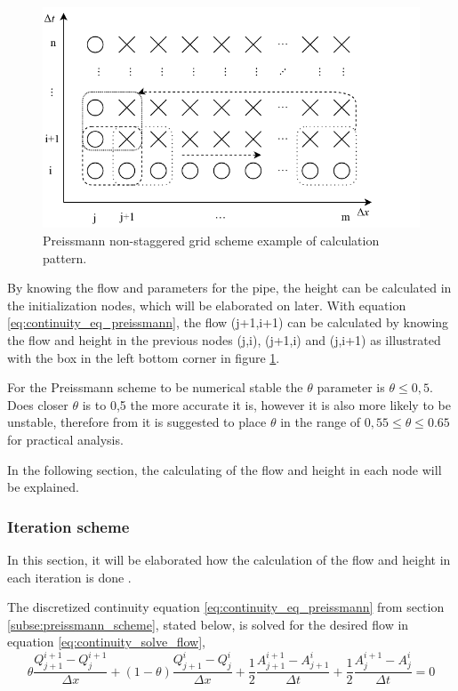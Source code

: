 \begin{figure}[H]
\centering
\includegraphics[width=.6\textwidth]{report/simulation/pictures/preissmann_scheme_iteration}
\caption{Preissmann non-staggered grid scheme example of calculation pattern.}
\label{fig:preissmann_grid_scheme_exampel}
\end{figure}
By knowing the flow and parameters for the pipe, the height can be calculated in the initialization nodes, which will be elaborated on later. With equation \ref{eq:continuity_eq_preissmann}, the flow (j+1,i+1) can be calculated by knowing the flow and height in the previous nodes (j,i), (j+1,i) and (j,i+1) as illustrated with the box in the left bottom corner in figure \ref{fig:preissmann_grid_scheme_exampel}.

For the Preissmann scheme to be numerical stable the $\theta$ parameter is $\theta \leq 0,5$. Does closer $\theta$ is to 0,5 the more accurate it is, however it is also more likely to be unstable, therefore from \cite{theta_decision} it is suggested to place $\theta$ in the range of $0,55 \leq \theta \leq 0.65$ for practical analysis.

In the following section, the calculating of the flow and height in each node will be explained.

\subsubsection*{Iteration scheme}
In this section, it will be elaborated how the calculation of the flow and height in each iteration is done \cite{ikke_stationear}.

The discretized continuity equation \ref{eq:continuity_eq_preissmann} from section \ref{subse:preissmann_scheme}, stated below, is solved for the desired flow in equation \ref{eq:continuity_solve_flow},
\begin{equation}
	\theta \frac{Q_{j+1}^{i+1}-Q_j^{i+1}}{\Delta x}+(1-\theta)\frac{Q_{j+1}^i - Q_j^i}{\Delta x}+
	\frac{1}{2}\frac{A_{j+1}^{i+1}-A_{j+1}^i}{\Delta t} + \frac{1}{2} \frac{A_{j}^{i+1} - A_j^i}{\Delta t} = 0
\end{equation}


